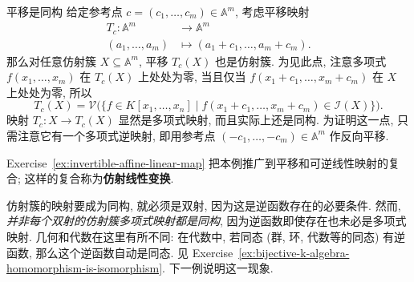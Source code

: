 \begin{Example}{平移是同构}\leavevmode\label{ex:translation-is-iso}
  给定参考点 $c=(c_{1},\ldots,c_{m})\in\mathbb{A}^{m}$, 考虑平移映射
  \[
    \begin{aligned}
      T_{c}:\mathbb{A}^{m}&\to\mathbb{A}^{m}\\
      (a_{1},\ldots,a_{m})&\mapsto(a_{1}+c_{1},\ldots,a_{m}+c_{m}).
    \end{aligned}
  \]
  那么对任意仿射簇 $X\subseteq\mathbb{A}^{m}$, 平移 $T_{c}(X)$ 也是仿射簇. 为见此点, 注意多项式 $f(x_{1},\ldots,x_{m})$ 在 $T_{c}(X)$ 上处处为零, 当且仅当 $f(x_{1}+c_{1},\ldots,x_{m}+c_{m})$ 在 $X$ 上处处为零, 所以
  \[
    T_{c}(X)=\mathcal{V}\bigl(\{f\in K[x_{1},\ldots,x_{n}]
      \mid f(x_{1}+c_{1},\ldots,x_{m}+c_{m})\in\mathcal{I}(X)\}\bigr).
  \]
  映射 $T_{c}:X\to T_{c}(X)$ 显然是多项式映射, 而且实际上还是同构. 为证明这一点, 只需注意它有一个多项式逆映射, 即用参考点 $(-c_{1},\ldots,-c_{m})\in\mathbb{A}^{m}$ 作反向平移.

  Exercise~\ref{ex:invertible-affine-linear-map} 把本例推广到平移和可逆线性映射的复合; 这样的复合称为\textbf{仿射线性变换}.
\end{Example}

\BookPairedNote
  {仿射簇的映射要成为同构, 就必须是双射, 因为这是逆函数存在的必要条件. 然而, \emph{并非每个双射的仿射簇多项式映射都是同构}, 因为逆函数即使存在也未必是多项式映射.}
  {几何和代数在这里有所不同: 在代数中, 若同态 (群, 环, 代数等的同态) 有逆函数, 那么这个逆函数自动是同态. 见 Exercise~\ref{ex:bijective-k-algebra-homomorphism-is-isomorphism}.}
\noindent 下一例说明这一现象.

